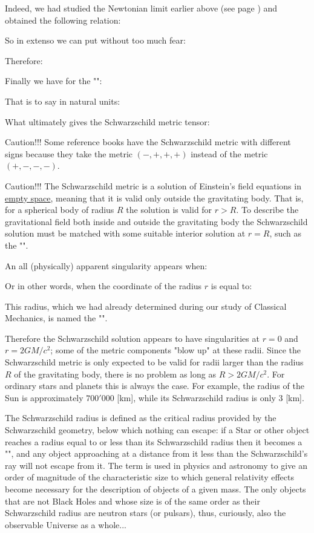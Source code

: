 	Indeed, we had studied the Newtonian limit earlier above (see page \pageref{newtonian limit}) and obtained the following relation:
	
	So in extenso we can put without too much fear:
	
	Therefore:
	
	Finally we have for the "":
	
	That is to say in natural units:
	
	What ultimately gives the Schwarzschild metric tensor:
	
	Caution!!! Some reference books have the Schwarzschild metric with different signs because they take the metric $(-, +, +, +)$ instead of the metric $(+, -, -, -)$.
	
	Caution!!! The Schwarzschild metric is a solution of Einstein's field equations in \underline{empty space}, meaning that it is valid only outside the gravitating body. That is, for a spherical body of radius $R$ the solution is valid for $r > R$. To describe the gravitational field both inside and outside the gravitating body the Schwarzschild solution must be matched with some suitable interior solution at $r = R$, such as the "".

	An all (physically) apparent singularity appears when:
	
	Or in other words, when the coordinate of the radius $r$ is equal to:
	
	This radius, which we had already determined during our study of Classical Mechanics, is named the "\label{schwarzschild radius}".

	Therefore the Schwarzschild solution appears to have singularities at $r = 0$ and $r = 2GM/c^2$; some of the metric components "blow up" at these radii. Since the Schwarzschild metric is only expected to be valid for radii larger than the radius $R$ of the gravitating body, there is no problem as long as $R > 2GM/c^2$. For ordinary stars and planets this is always the case. For example, the radius of the Sun is approximately $700'000$ [km], while its Schwarzschild radius is only $3$ [km].
	
	The Schwarzschild radius is defined as the critical radius provided by the Schwarzschild geometry, below which nothing can escape: if a Star or other object reaches a radius equal to or less than its Schwarzschild radius then it becomes a "", and any object approaching at a distance from it less than the Schwarzschild's ray will not escape from it. The term is used in physics and astronomy to give an order of magnitude of the characteristic size to which general relativity effects become necessary for the description of objects of a given mass. The only objects that are not Black Holes and whose size is of the same order as their Schwarzschild radius are neutron stars (or pulsars), thus, curiously, also the observable Universe as a whole...
	
